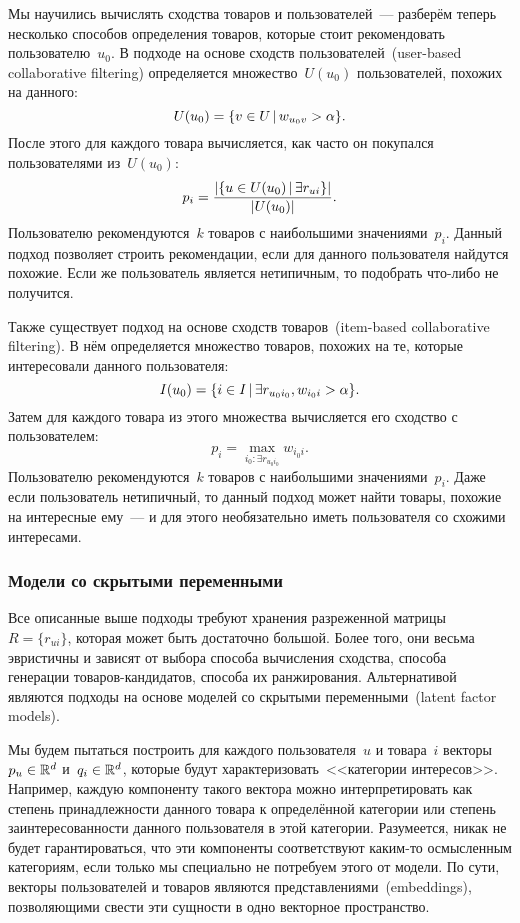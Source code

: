 \documentclass[12pt,fleqn]{article}
\begin{document}
Мы научились вычислять сходства товаров и пользователей~---
разберём теперь несколько способов определения товаров, которые стоит
рекомендовать пользователю~$u_0$.
В подходе на основе сходств пользователей~(user-based collaborative filtering)
определяется множество~$U(u_0)$ пользователей, похожих на данного:
\[
    U(u_0)
    =
    \{v \in U
        \mspace{3mu}{|}\mspace{3mu}
        w_{u_0 v} > \alpha
    \}.
\]
После этого для каждого товара вычисляется, как часто он покупался пользователями из~$U(u_0)$:
\[
    p_{i}
    =
    \frac{
        |\{u \in U(u_0) \mspace{3mu}{|}\mspace{3mu} \exists r_{ui}\}|
    }{
        |U(u_0)|
    }.
\]
Пользователю рекомендуются~$k$ товаров с наибольшими значениями~$p_i$.
Данный подход позволяет строить рекомендации, если для данного пользователя найдутся похожие.
Если же пользователь является нетипичным, то подобрать что-либо не получится.

Также существует подход на основе сходств товаров~(item-based collaborative filtering).
В нём определяется множество товаров, похожих на те, которые интересовали данного пользователя:
\[
    I(u_0)
    =
    \{
        i \in I
        \mspace{3mu}{|}\mspace{3mu}
        \exists r_{u_0 i_0},
        w_{i_0 i} > \alpha
    \}.
\]
Затем для каждого товара из этого множества вычисляется его сходство с пользователем:
\[
    p_i
    =
    \max_{i_0: \exists r_{u_0 i_0}}
    w_{i_0 i}.
\]
Пользователю рекомендуются~$k$ товаров с наибольшими значениями~$p_i$.
Даже если пользователь нетипичный, то данный подход может найти товары, похожие
на интересные ему~--- и для этого необязательно иметь пользователя со схожими интересами.

\subsubsection{Модели со скрытыми переменными}
Все описанные выше подходы требуют хранения разреженной матрицы~$R = \{r_{ui}\}$,
которая может быть достаточно большой.
Более того, они весьма эвристичны и зависят от выбора способа вычисления сходства,
способа генерации товаров-кандидатов, способа их ранжирования.
Альтернативой являются подходы на основе моделей со скрытыми переменными~(latent factor models).

Мы будем пытаться построить для каждого пользователя~$u$ и товара~$i$ векторы~$p_u \in \mathbb{R}^d$
и~$q_i \in \mathbb{R}^d$, которые будут характеризовать~<<категории интересов>>.
Например, каждую компоненту такого вектора можно интерпретировать как степень принадлежности
данного товара к определённой категории или степень заинтересованности данного пользователя
в этой категории.
Разумеется, никак не будет гарантироваться, что эти компоненты соответствуют каким-то осмысленным категориям,
если только мы специально не потребуем этого от модели.
По сути, векторы пользователей и товаров являются представлениями~(embeddings),
позволяющими свести эти сущности в одно векторное пространство.
\end{document}
